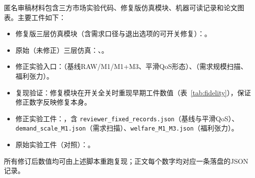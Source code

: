 \documentclass[UTF8,11pt]{ctexart}
\begin{document}
匿名审稿材料包含三方市场实验代码、修复版仿真模块、机器可读记录和论文图表。主要工件如下：
\begingroup
\raggedright
\begin{itemize}[leftmargin=2em]
  \item 修复版三层仿真模块（含需求口径与退出选项的可开关修复）：。
  \item 原始（未修正）三层仿真：、。
  \item 修正实验入口：（基线RAW/M1/M1+M3、平滑QoS形态）、（需求规模扫描、福利张力）。
  \item 复现验证：修复模块在开关全关时重现早期工件数值（表~\ref{tab:fidelity}），保证修正数字反映修复本身。
  \item 修正实验工件：，含 \texttt{reviewer\_fixed\_records.json}（基线与平滑QoS）、\texttt{demand\_scale\_M1.json}（需求扫描）、\texttt{welfare\_M1\_M3.json}（福利张力）。
  \item 原始实验工件（对照）：。
\end{itemize}
\endgroup
所有修订后数值均可由上述脚本重跑复现；正文每个数字均对应一条落盘的JSON记录。

\small


\end{document}
